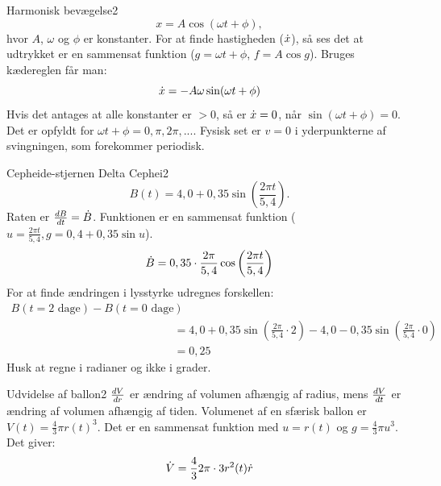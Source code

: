 \begin{opgave}{Harmonisk bevægelse}{2}
\begin{equation*}
x = A \cos (\omega t + \phi),
\end{equation*}
hvor $A$, $\omega$ og $\phi$ er konstanter. 
\opg For at finde hastigheden ($\dot{x}$), så ses det at udtrykket er en sammensat funktion ($g=\omega t+\phi$, $f=A\cos g$). Bruges kædereglen får man:
\begin{equation*}
\dot{x} = - A\omega \sin(\omega t + \phi)
\end{equation*}
\opg Hvis det antages at alle konstanter er $>0$, så er $\dot{x}=0$, når $\sin(\omega t + \phi) = 0$. Det er opfyldt for $\omega t + \phi = 0, \pi, 2\pi, ...$. Fysisk set er $v=0$ i yderpunkterne af svingningen, som forekommer periodisk.
\end{opgave}
\begin{opgave}{Cepheide-stjernen Delta Cephei}{2}
\begin{equation*}
B(t) = 4,0 + 0,35\sin \left( \frac{2\pi t}{5,4} \right).
\end{equation*}
\opg Raten er ${d{B} \over d{t}} = \dot{B}$. Funktionen er en sammensat funktion ($u=\frac{2\pi t}{5,4}, g=0,4+0,35 \sin u$).
\begin{equation*}
\dot{B} = 0,35 \cdot \frac{2\pi}{5,4} \cos \left( \frac{2\pi t}{5,4} \right)
\end{equation*}
\opg For at finde ændringen i lysstyrke udregnes forskellen:
\begin{align*}
B(t=\text{2 dage})-B(t=\text{0 dage}) \\
&= 4,0 + 0,35\sin\left(\frac{2\pi}{5,4} \cdot 2 \right) - 4,0 -0,35\sin\left(\frac{2\pi}{5,4} \cdot 0 \right) \\
&= 0,25
\end{align*}
Husk at regne i radianer og ikke i grader.
\end{opgave}

\begin{opgave}{Udvidelse af ballon}{2}
\opg ${d{V} \over d{r}}$ er ændring af volumen afhængig af radius, mens ${d{V} \over d{t}}$ er ændring af volumen afhængig af tiden.
\opg Volumenet af en sfærisk ballon er $V(t)=\frac{4}{3} \pi r(t)^3$. Det er en sammensat funktion med $u=r(t)$ og $g=\frac{4}{3} \pi u^3$. Det giver:
\begin{equation*}
\dot{V} = \frac{4}{3} 2\pi \cdot 3 r^2(t) \dot{r}
\end{equation*}
\end{opgave}

